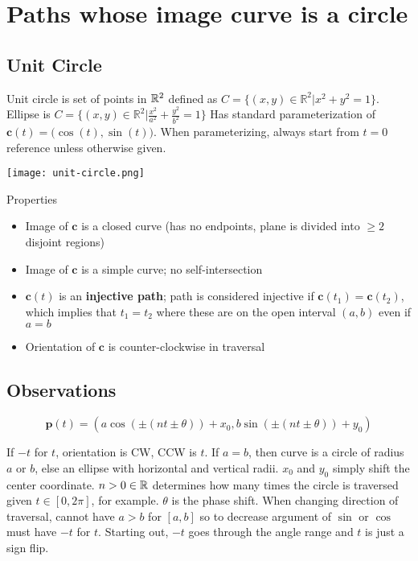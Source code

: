 \section{Paths whose image curve is a circle}

\subsection{Unit Circle}

Unit circle is set of points in $\mathbb{R}^2$ defined as $C=\{(x,y)\in\mathbb{R} ^2|x^2+y^2=1\}$. Ellipse is
$C=\{(x,y)\in\mathbb{R} ^2|\frac{x^2}{a^2}+\frac{y^2}{b^2}=1\}$
Has standard parameterization of $\textbf{c}(t)=\big(\cos(t),\sin(t)\big)$.
When parameterizing, always start from $t=0$ reference unless otherwise given.\newline 

\begin{center}
    \texttt{[image: unit-circle.png]}
\end{center}

\noindent Properties
\begin{itemize}
    \item Image of $\textbf{c}$ is a closed curve (has no endpoints, plane is divided into $\geq 2$ disjoint regions)
    \item Image of $\textbf{c}$ is a simple curve; no self-intersection 
    \item $\textbf{c}(t)$ is an \textbf{injective path}; path is considered injective if $\textbf{c}(t_1)=\textbf{c}(t_2)$, which implies that $t_1=t_2$ where 
    these are on the open interval $(a,b)$ even if $a=b$
    \item Orientation of $\textbf{c}$ is counter-clockwise in traversal
\end{itemize}

\subsection{Observations}

\[\boxed{\textbf{p}(t)=(a\cos (\pm (nt \pm\theta)) + x_0, b\sin (\pm (nt \pm \theta)) + y_0)}\]

If $-t$ for $t$, orientation is CW, CCW is $t$. If $a=b$, then curve is 
a circle of radius $a$ or $b$, else an ellipse with horizontal and vertical radii.
$x_0$ and $y_0$ simply shift the center coordinate. $n>0\in \mathbb{R}$ determines how many times
the circle is traversed given $t\in[0,2\pi]$, for example. $\theta$ is the phase shift.
When changing direction of traversal, cannot have $a>b$ for $[a,b]$ so to decrease argument of $\sin$ or $\cos$
must have $-t$ for $t$. Starting out, $-t$ goes through the angle range and $t$ is just a sign flip.

